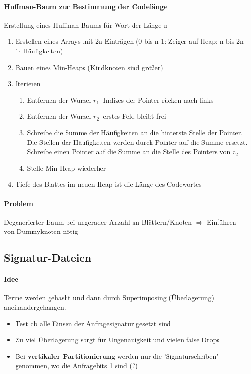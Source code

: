 \documentclass{article}
\begin{document}
\paragraph{Huffman-Baum zur Bestimmung der Codelänge} Erstellung eines Huffman-Baums für Wort der Länge n
\begin{enumerate}
\item Erstellen eines Arrays mit 2n Einträgen (0 bis n-1: Zeiger auf Heap; n bis 2n-1: Häufigkeiten)
\item Bauen eines Min-Heaps (Kindknoten sind größer)
\item Iterieren
\begin{enumerate}
\item Entfernen der Wurzel $r_{1}$, Indizes der Pointer rücken nach links
\item Entfernen der Wurzel $r_{2}$, erstes Feld bleibt frei
\item Schreibe die Summe der Häufigkeiten an die hinterste Stelle der Pointer. Die Stellen der Häufigkeiten werden durch Pointer auf die Summe ersetzt. Schreibe einen Pointer auf die Summe an die Stelle des Pointers von $r_{2}$
\item Stelle Min-Heap wiederher
\end{enumerate}
\item Tiefe des Blattes im neuen Heap ist die Länge des Codewortes
\end{enumerate}

\paragraph{Problem} Degenerierter Baum bei ungerader Anzahl an Blättern/Knoten $\Rightarrow$ Einführen von Dummyknoten nötig

\subsection{Signatur-Dateien}
\paragraph{Idee} Terme werden gehasht und dann durch Superimposing (Überlagerung) aneinandergehangen.
\begin{itemize}
\item Test ob alle Einsen der Anfragesignatur gesetzt sind
\item Zu viel Überlagerung sorgt für Ungenauigkeit und vielen false Drops
\item Bei \textbf{vertikaler Partitionierung} werden nur die 'Signaturscheiben' genommen, wo die Anfragebits 1 sind (?)
\end{itemize}
\end{document}
